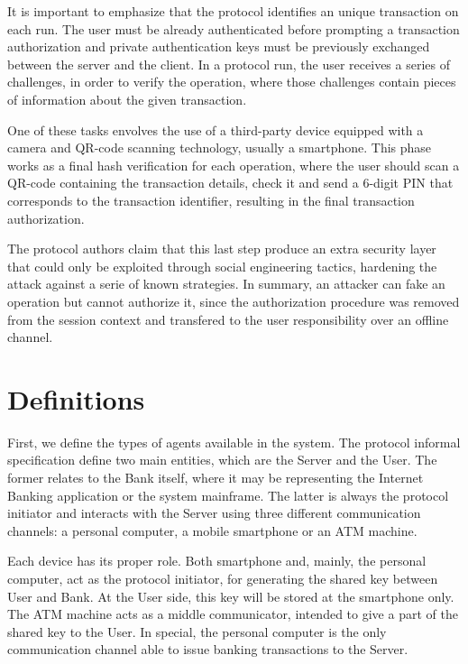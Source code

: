 It is important to emphasize that the protocol identifies an unique transaction on each run. The user must be already authenticated before prompting a transaction authorization and private authentication keys must be previously exchanged between the server and the client. In a protocol run, the user receives a series of challenges, in order to verify the operation, where those challenges contain pieces of information about the given transaction.

One of these tasks envolves the use of a third-party device equipped with a camera and QR-code scanning technology, usually a smartphone. This phase works as a final hash verification for each operation, where the user should scan a QR-code containing the transaction details, check it and send a 6-digit PIN that corresponds to the transaction identifier, resulting in the final transaction authorization.

The protocol authors claim that this last step produce an extra security layer that could only be exploited through social engineering tactics, hardening the attack against a serie of known strategies. In summary, an attacker can fake an operation but cannot authorize it, since the authorization procedure was removed from the session context and transfered to the user responsibility over an offline channel.





\section{Definitions}
First, we define the types of agents available in the system. The protocol informal specification define two main entities, which are the Server and the User. The former relates to the Bank itself, where it may be representing the Internet Banking application or the system mainframe. The latter is always the protocol initiator and interacts with the Server using three different communication channels: a personal computer, a mobile smartphone or an ATM machine.

Each device has its proper role. Both smartphone and, mainly, the personal computer, act as the protocol initiator, for generating the shared key between User and Bank. At the User side, this key will be stored at the smartphone only. The ATM machine acts as a middle communicator, intended to give a part of the shared key to the User. In special, the personal computer is the only communication channel able to issue banking transactions to the Server.

